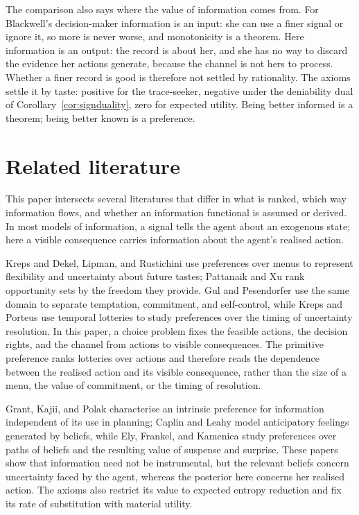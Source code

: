\documentclass[11pt,a4paper]{article}
\theoremstyle{definition}
\newcommand{\1}{\mathbf 1}
\begin{document}
The comparison also says where the value of information comes from.  For Blackwell's decision-maker information
is an input: she can use a finer signal or ignore it, so more is never worse, and monotonicity is a theorem.
Here information is an output: the record is about her, and she has no way to discard the evidence her actions
generate, because the channel is not hers to process.  Whether a finer record is good is therefore not settled
by rationality.  The axioms settle it by taste: positive for the trace-seeker, negative under the deniability
dual of Corollary~\ref{cor:signduality}, zero for expected utility.  Being better informed is a theorem; being
better known is a preference.


\section{Related literature}\label{sec:literature}

This paper intersects several literatures that differ in what is ranked, which way information flows, and
whether an information functional is assumed or derived.  In most models of information, a signal tells the
agent about an exogenous state; here a visible consequence carries information about the agent's realised
action.

Kreps \cite{Kreps1979} and Dekel, Lipman, and Rustichini \cite{DekelLipmanRustichini2001} use preferences over
menus to represent flexibility and uncertainty about future tastes; Pattanaik and Xu \cite{PattanaikXu1990} rank
opportunity sets by the freedom they provide.  Gul and Pesendorfer \cite{GulPesendorfer2001} use the same domain
to separate temptation, commitment, and self-control, while Kreps and Porteus \cite{KrepsPorteus1978} use
temporal lotteries to study preferences over the timing of uncertainty resolution.  In this paper, a choice
problem fixes the feasible actions, the decision rights, and the channel from actions to visible consequences.
The primitive preference ranks lotteries over actions and therefore reads the dependence between the realised
action and its visible consequence, rather than the size of a menu, the value of commitment, or the timing of
resolution.

Grant, Kajii, and Polak \cite{GrantKajiiPolak1998} characterise an intrinsic preference for information
independent of its use in planning; Caplin and Leahy \cite{CaplinLeahy2001} model anticipatory feelings generated
by beliefs, while Ely, Frankel, and Kamenica \cite{ElyFrankelKamenica2015} study preferences over paths of beliefs
and the resulting value of suspense and surprise.  These papers show that information need not be instrumental,
but the relevant beliefs concern uncertainty faced by the agent, whereas the posterior here concerns her
realised action.  The axioms also restrict its value to expected entropy reduction and fix its rate of
substitution with material utility.
\end{document}
